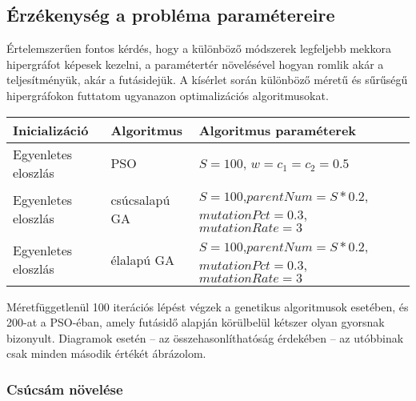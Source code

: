 \subsection{Érzékenység a probléma paramétereire}

Értelemszerűen fontos kérdés, hogy a különböző módszerek legfeljebb mekkora hipergráfot képesek kezelni, a paramétertér növelésével hogyan romlik akár a teljesítményük, akár a futásidejük. A kísérlet során különböző méretű és sűrűségű hipergráfokon futtatom ugyanazon optimalizációs algoritmusokat.

\begin{longtable}{| p{} | p{} | p{} |}
		\hline
		\hfil \textbf{Inicializáció} & \hfil \textbf{Algoritmus} & \hfil \textbf{Algoritmus paraméterek} \\
		\hline \hline
		\hfil Egyenletes eloszlás & \hfil PSO & $S=100$, $w=c_1=c_2=0.5$\\
		\hline
		\vfil \hfil Egyenletes eloszlás & \vfil \hfil csúcsalapú GA & $S=100$,\newline$parentNum=S*0.2$,\newline$mutationPct=0.3$,\newline$mutationRate=3$\\
		\hline
		\vfil \hfil Egyenletes eloszlás & \vfil \hfil élalapú GA & $S=100$,\newline$parentNum=S*0.2$,\newline$mutationPct=0.3$,\newline$mutationRate=3$ \\
		\hline
\end{longtable}

Méretfüggetlenül 100 iterációs lépést végzek a genetikus algoritmusok esetében, és 200-at a PSO-éban, amely futásidő alapján körülbelül kétszer olyan gyorsnak bizonyult. Diagramok esetén -- az összehasonlíthatóság érdekében -- az utóbbinak csak minden második értékét ábrázolom.

\subsubsection{Csúcsám növelése}

